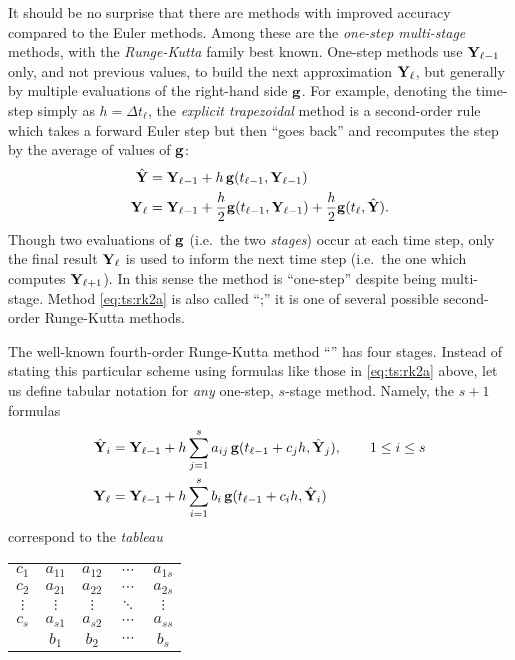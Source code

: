 It should be no surprise that there are methods with improved accuracy compared to the Euler methods.  Among these are the \emph{one-step multi-stage} methods, with the \emph{Runge-Kutta} family best known.  One-step methods use $\mathbf{Y}_{\ell-1}$ only, and not previous values, to build the next approximation $\mathbf{Y}_\ell$, but generally by multiple evaluations of the right-hand side $\mathbf{g}$.  For example, denoting the time-step simply as $h=\Delta t_\ell$, the \emph{explicit trapezoidal} method \citep{AscherPetzold1998} is a second-order rule which takes a forward Euler step but then ``goes back'' and recomputes the step by the average of values of $\mathbf{g}$:
\begin{align}
\hat{\mathbf{Y}} &= \mathbf{Y}_{\ell-1} + h\, \mathbf{g}(t_{\ell-1},\mathbf{Y}_{\ell-1}) \label{eq:ts:rk2a} \\
\mathbf{Y}_\ell &= \mathbf{Y}_{\ell-1} + \frac{h}{2} \mathbf{g}(t_{\ell-1},\mathbf{Y}_{\ell-1}) + \frac{h}{2} \mathbf{g}(t_\ell,\hat{\mathbf{Y}}). \notag
\end{align}
Though two evaluations of $\mathbf{g}$ (i.e.~the two \emph{stages}) occur at each time step, only the final result $\mathbf{Y}_\ell$ is used to inform the next time step (i.e.~the one which computes $\mathbf{Y}_{\ell+1}$).  In this sense the method is ``one-step'' despite being multi-stage.  Method \eqref{eq:ts:rk2a} is also called ``\RKtwoa;'' it is one of several possible second-order Runge-Kutta methods.

The well-known fourth-order Runge-Kutta method ``\RKfour'' has four stages.  Instead of stating this particular scheme using formulas like those in \eqref{eq:ts:rk2a} above, let us define tabular notation for \emph{any} one-step, $s$-stage method.  Namely, the $s+1$ formulas
\begin{align}
\hat{\mathbf{Y}}_i &= \mathbf{Y}_{\ell-1} + h \sum_{j=1}^s a_{ij}\, \mathbf{g}(t_{\ell-1} + c_j h, \hat{\mathbf{Y}}_j), \qquad 1 \le i \le s \label{eq:ts:rkgeneral} \\
\mathbf{Y}_\ell  &= \mathbf{Y}_{\ell-1} + h \sum_{i=1}^s b_i\, \mathbf{g}(t_{\ell-1} + c_i h, \hat{\mathbf{Y}}_i) \notag
\end{align}
correspond to the \emph{tableau} \citep{Butcher2008}
\begin{center}
\begin{tabular}{c|cccc}
$c_1$    & $a_{11}$ & $a_{12}$ & $\cdots$ & $a_{1s}$ \\
$c_2$    & $a_{21}$ & $a_{22}$ & $\cdots$ & $a_{2s}$ \\
$\vdots$ & $\vdots$ & $\vdots$ & $\ddots$ & $\vdots$ \\
$c_s$    & $a_{s1}$ & $a_{s2}$ & $\cdots$ & $a_{ss}$ \\ \hline
         & $b_1$    & $b_2$    & $\cdots$ & $b_s$
\end{tabular}
\end{center}

